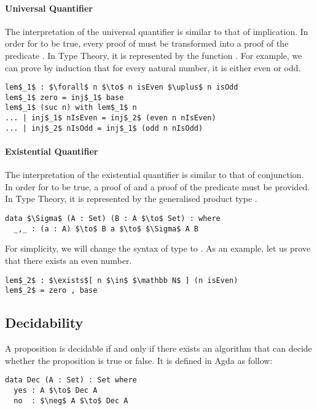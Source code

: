 \paragraph{Universal Quantifier} The interpretation of the universal
quantifier is similar to that of implication. In order for  to be true, every
proof  of  must be transformed into a proof of the predicate
. In Type Theory, it is represented by the function . For example, we can prove by induction that for every natural
number, it is either even or odd.
\begin{lstlisting}[mathescape=true,xleftmargin=.25\textwidth]
lem$_1$ : $\forall$ n $\to$ n isEven $\uplus$ n isOdd
lem$_1$ zero = inj$_1$ base
lem$_1$ (suc n) with lem$_1$ n
... | inj$_1$ nIsEven = inj$_2$ (even n nIsEven)
... | inj$_2$ nIsOdd = inj$_1$ (odd n nIsOdd)
\end{lstlisting} 

\paragraph{Existential Quantifier} The interpretation of the
existential quantifier is similar to that of conjunction. In order for
 to be true, a proof  of  and a proof of the predicate
 must be provided. In Type Theory, it is represented by the generalised
product type \mb{\Sigma}. 
\begin{lstlisting}[mathescape=true,xleftmargin=.25\textwidth]
data $\Sigma$ (A : Set) (B : A $\to$ Set) : where
  _,_ : (a : A) $\to$ B a $\to$ $\Sigma$ A B
\end{lstlisting}

\par For simplicity, we will change the syntax of \mb{\Sigma} type to
. As an example, let us prove that
there exists an even number. 
\begin{lstlisting}[mathescape=true,xleftmargin=.25\textwidth]
lem$_2$ : $\exists$[ n $\in$ $\mathbb N$ ] (n isEven)
lem$_2$ = zero , base
\end{lstlisting}


\subsection{Decidability} 
\par A proposition is decidable if and only if there
exists an algorithm that can decide whether the proposition is true or false. It is
defined in Agda as follow: 
\begin{lstlisting}[mathescape=true,xleftmargin=.25\textwidth]
data Dec (A : Set) : Set where
  yes : A $\to$ Dec A
  no  : $\neg$ A $\to$ Dec A
\end{lstlisting}

